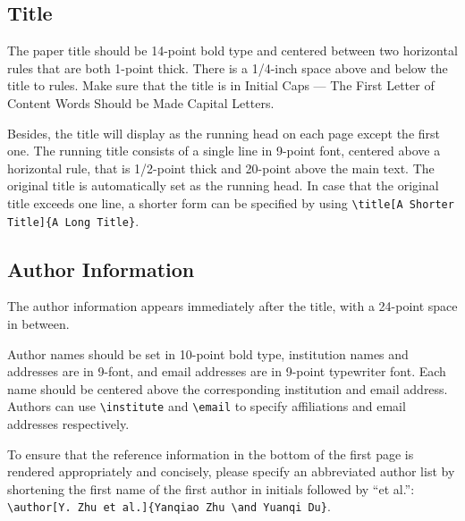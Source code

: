 \documentclass{article}
\begin{document}
\subsection{Title}

The paper title should be 14-point bold type and centered between two horizontal rules that are both 1-point thick.
There is a 1/4-inch space above and below the title to rules.
Make sure that the title is in Initial Caps --- The First Letter of Content Words Should be Made Capital Letters.

Besides, the title will display as the running head on each page except the first one.
The running title consists of a single line in 9-point font, centered above a horizontal rule, that is 1/2-point thick and 20-point above the main text.
The original title is automatically set as the running head.
In case that the original title exceeds one line, a shorter form can be specified by using \verb+\title[A Shorter Title]{A Long Title}+.

\subsection{Author Information}
The author information appears immediately after the title, with a 24-point space in between.

Author names should be set in 10-point bold type, institution names and addresses are in 9-font, and email addresses are in 9-point typewriter font.
Each name should be centered above the corresponding institution and email address.
Authors can use \verb+\institute+ and \verb+\email+ to specify affiliations and email addresses respectively.

To ensure that the reference information in the bottom of the first page is rendered appropriately and concisely, please specify an abbreviated author list by shortening the first name of the first author in initials followed by ``et al.'': \verb+\author[Y. Zhu et al.]{Yanqiao Zhu \and Yuanqi Du}+.
\end{document}
